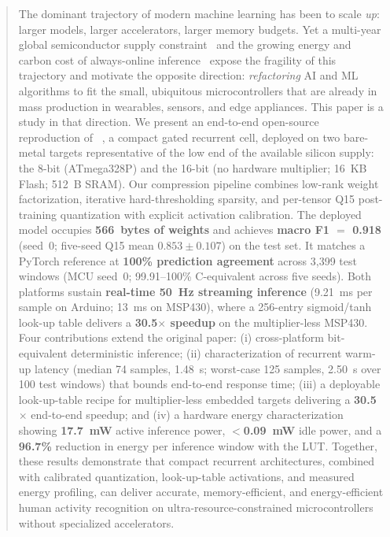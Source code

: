 \begin{abstract}
The dominant trajectory of modern machine learning has been to
scale \emph{up}: larger models, larger accelerators, larger memory
budgets. Yet a multi-year global semiconductor supply
constraint~\cite{burkacky2022chipshortage,khan2021chipshortage} and
the growing energy and carbon cost of always-online
inference~\cite{strubell2019energy,patterson2021carbon} expose the
fragility of this trajectory and motivate the opposite direction:
\emph{refactoring} AI and ML algorithms to fit the small,
ubiquitous microcontrollers that are already in mass production in
wearables, sensors, and edge appliances. This
paper is a study in that direction. We present an end-to-end
open-source reproduction of
\fastgrnn{}~\cite{kusupati2018fastgrnn}, a compact gated recurrent
cell, deployed on two bare-metal targets representative of the
low end of the available silicon supply: the 8-bit \arduino{}
(ATmega328P) and the 16-bit \msp{} (no hardware multiplier;
16~KB Flash; 512~B SRAM). Our compression pipeline combines
low-rank weight factorization, iterative hard-thresholding
sparsity, and per-tensor Q15 post-training quantization with
explicit activation calibration. The deployed model occupies \textbf{566~bytes of weights} and
achieves \textbf{macro F1 $=$ 0.918} (seed~0; five-seed Q15
mean $0.853{\pm}0.107$) on the \hapt{} test set.
It matches a PyTorch reference at \textbf{100\% prediction
agreement} across 3{,}399 test windows (MCU seed~0; 99.91--100\%
C-equivalent across five seeds).
Both platforms sustain \textbf{real-time 50~Hz streaming
inference} (9.21~ms per sample on Arduino; 13~ms on MSP430), where
a 256-entry sigmoid/tanh look-up table delivers a
\textbf{30.5$\times$ speedup} on the multiplier-less MSP430.
Four contributions extend the original \fastgrnn{} paper:
(i) cross-platform bit-equivalent deterministic inference;
(ii) characterization of recurrent warm-up latency (median 74 samples,
1.48~s; worst-case 125 samples, 2.50~s over 100 test windows) that
bounds end-to-end response time;
(iii) a deployable look-up-table recipe for multiplier-less embedded
targets delivering a \textbf{30.5$\times$} end-to-end speedup; and
(iv) a hardware energy characterization showing \textbf{17.7~mW}
active inference power, \textbf{$<$0.09~mW} idle power, and a
\textbf{96.7\%} reduction in energy per inference window with the LUT.
Together, these results demonstrate that compact recurrent
architectures, combined with calibrated quantization, look-up-table
activations, and measured energy profiling, can deliver accurate,
memory-efficient, and energy-efficient human activity recognition on
ultra-resource-constrained microcontrollers without specialized
accelerators.
\end{abstract}
